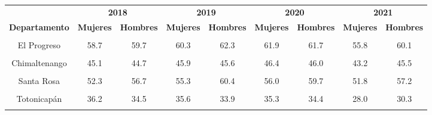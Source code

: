 \begin{tabular}[t]{ccccccccc}
\toprule
\multicolumn{1}{c}{\textbf{ }} & \multicolumn{2}{c}{\textbf{2018}} & \multicolumn{2}{c}{\textbf{2019}} & \multicolumn{2}{c}{\textbf{2020}} & \multicolumn{2}{c}{\textbf{2021}} \\
\cmidrule(l{3pt}r{3pt}){2-3} \cmidrule(l{3pt}r{3pt}){4-5} \cmidrule(l{3pt}r{3pt}){6-7} \cmidrule(l{3pt}r{3pt}){8-9}
\textbf{Departamento} & \textbf{Mujeres} & \textbf{Hombres} & \textbf{Mujeres} & \textbf{Hombres} & \textbf{Mujeres} & \textbf{Hombres} & \textbf{Mujeres} & \textbf{Hombres}\\
\midrule
\cellcolor[HTML]{B6B3FF}{Guatemala} & \cellcolor[HTML]{B6B3FF}{81.7} & \cellcolor[HTML]{B6B3FF}{83.4} & \cellcolor[HTML]{B6B3FF}{84.4} & \cellcolor[HTML]{B6B3FF}{86.7} & \cellcolor[HTML]{B6B3FF}{82.4} & \cellcolor[HTML]{B6B3FF}{84.6} & \cellcolor[HTML]{B6B3FF}{74.2} & \cellcolor[HTML]{B6B3FF}{78.5}\\
El Progreso & 58.7 & 59.7 & 60.3 & 62.3 & 61.9 & 61.7 & 55.8 & 60.1\\
\cellcolor[HTML]{B6B3FF}{Sacatepéquez} & \cellcolor[HTML]{B6B3FF}{62.7} & \cellcolor[HTML]{B6B3FF}{63.5} & \cellcolor[HTML]{B6B3FF}{65.0} & \cellcolor[HTML]{B6B3FF}{66.8} & \cellcolor[HTML]{B6B3FF}{63.2} & \cellcolor[HTML]{B6B3FF}{66.8} & \cellcolor[HTML]{B6B3FF}{59.4} & \cellcolor[HTML]{B6B3FF}{64.3}\\
Chimaltenango & 45.1 & 44.7 & 45.9 & 45.6 & 46.4 & 46.0 & 43.2 & 45.5\\
\cellcolor[HTML]{B6B3FF}{Escuintla} & \cellcolor[HTML]{B6B3FF}{54.4} & \cellcolor[HTML]{B6B3FF}{54.3} & \cellcolor[HTML]{B6B3FF}{58.9} & \cellcolor[HTML]{B6B3FF}{58.7} & \cellcolor[HTML]{B6B3FF}{58.9} & \cellcolor[HTML]{B6B3FF}{57.8} & \cellcolor[HTML]{B6B3FF}{53.9} & \cellcolor[HTML]{B6B3FF}{54.8}\\
Santa Rosa & 52.3 & 56.7 & 55.3 & 60.4 & 56.0 & 59.7 & 51.8 & 57.2\\
\cellcolor[HTML]{B6B3FF}{Sololá} & \cellcolor[HTML]{B6B3FF}{45.9} & \cellcolor[HTML]{B6B3FF}{46.5} & \cellcolor[HTML]{B6B3FF}{45.7} & \cellcolor[HTML]{B6B3FF}{46.2} & \cellcolor[HTML]{B6B3FF}{45.1} & \cellcolor[HTML]{B6B3FF}{46.3} & \cellcolor[HTML]{B6B3FF}{41.0} & \cellcolor[HTML]{B6B3FF}{43.7}\\
Totonicapán & 36.2 & 34.5 & 35.6 & 33.9 & 35.3 & 34.4 & 28.0 & 30.3\\
\cellcolor[HTML]{B6B3FF}{Quetzaltenango} & \cellcolor[HTML]{B6B3FF}{54.1} & \cellcolor[HTML]{B6B3FF}{51.4} & \cellcolor[HTML]{B6B3FF}{54.8} & \cellcolor[HTML]{B6B3FF}{52.8} & \cellcolor[HTML]{B6B3FF}{56.2} & \cellcolor[HTML]{B6B3FF}{54.2} & \cellcolor[HTML]{B6B3FF}{52.2} & \cellcolor[HTML]{B6B3FF}{52.3}\\

\end{tabular}
